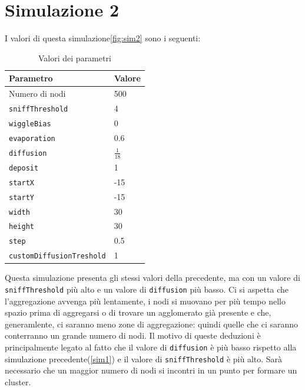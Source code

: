 \section{Simulazione 2}\label{sim2}
I valori di questa simulazione\space \cref{fig:sim2} sono i seguenti:
\begin{table}[ht]
    \centering
    \caption{Valori dei parametri}
    \begin{tabular}{ll}
        \hline
        Parametro                   & Valore \\
        \hline
        Numero di nodi              & 500    \\
        \texttt{sniffThreshold}     & 4      \\
        \texttt{wiggleBias}         & 0      \\
        \texttt{evaporation}        & 0.6    \\
        \texttt{diffusion}          & $\frac{1}{18}$ \\
        \texttt{deposit}            & 1      \\
        \texttt{startX}             & -15    \\
        \texttt{startY}             & -15    \\
        \texttt{width}              & 30     \\
        \texttt{height}             & 30     \\
        \texttt{step}               & 0.5    \\
        \texttt{customDiffusionTreshold} & 1 \\
        \hline
    \end{tabular}\label{tab:parametr2}
\end{table}\newline
Questa simulazione presenta gli stessi valori della precedente, ma con un valore di \texttt{sniffThreshold} più alto e un valore di \texttt{diffusion} più basso.
Ci si aspetta che l'aggregazione avvenga più lentamente, i nodi si muovano per più tempo nello spazio prima di aggregarsi o di trovare un 
agglomerato già presente e che, generamlente, ci saranno meno zone di aggregazione: quindi quelle che ci saranno 
conterranno un grande numero di nodi. Il motivo di queste deduzioni è principalmente legato al fatto che il valore di \texttt{diffusion} è più basso rispetto alla simulazione
precedente\space(\cref{sim1}) e il valore di \texttt{sniffThreshold} è più alto. Sarà necessario che un maggior numero di nodi 
si incontri in un punto per formare un cluster. 

